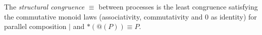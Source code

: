 \documentclass{llncs}
\renewcommand{\:}{\colon}
\newcommand{\pzero}{\mathbin{0}}
\begin{document}
\begin{definition}
  The {\em structural congruence} $\equiv$
  between processes \cite{SangiorgiWalker} is the least congruence
  satisfying the commutative monoid laws
  (associativity, commutativity and $\pzero$ as identity) for parallel
  composition $|$ and $*(@(P)) \equiv P$.
\end{definition}












\end{document}
